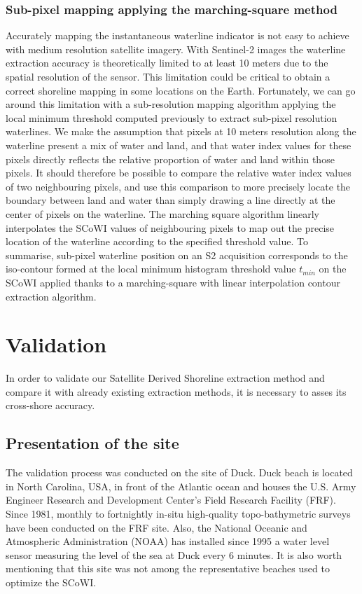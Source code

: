 \documentclass[remotesensing,article,submit,pdftex,moreauthors]{Definitions/mdpi}
\begin{document}
\subsubsection{Sub-pixel mapping applying the marching-square method}
Accurately mapping the instantaneous waterline indicator is not easy to achieve with medium resolution satellite imagery.
With Sentinel-2 images the waterline extraction accuracy is theoretically limited to at least 10 meters due to the spatial resolution of the sensor.
This limitation could be critical to obtain a correct shoreline mapping in some locations on the Earth.
Fortunately, we can go around this limitation with a sub-resolution mapping algorithm applying the local minimum threshold computed previously to extract sub-pixel resolution waterlines.
We make the assumption that pixels at 10 meters resolution along the waterline present a mix of water and land, and that water index values for these pixels directly reflects the relative proportion of water and land within those pixels. 
It should therefore be possible to compare the relative water index values of two neighbouring pixels, and use this comparison to more precisely locate the boundary between land and water than simply drawing a line directly at the center of pixels on the waterline.
The marching square algorithm linearly interpolates the SCoWI values of neighbouring pixels to map out the precise location of the waterline according to the specified threshold value.\citep{CIPOLLETTI201287}
To summarise, sub-pixel waterline position on an S2 acquisition corresponds to the iso-contour formed at the local minimum histogram threshold value $t_{min}$ on the SCoWI applied thanks to a marching-square with linear interpolation contour extraction algorithm.



\section{Validation}
In order to validate our Satellite Derived Shoreline extraction method and compare it with already existing extraction methods, it is necessary to asses its cross-shore accuracy. 

\subsection{Presentation of the site}
The validation process was conducted on the site of Duck.
Duck beach is located in North Carolina, USA, in front of the Atlantic ocean and houses the U.S. Army Engineer Research and Development Center’s Field Research Facility (FRF).
Since 1981, monthly to fortnightly in-situ high-quality topo-bathymetric surveys have been conducted on the FRF site. \citep{FORTE2017}
Also, the National Oceanic and Atmospheric Administration (NOAA) has installed since 1995 a water level sensor measuring the level of the sea at Duck every 6 minutes. \citep{park2014water}
It is also worth mentioning that this site was not among the representative beaches used to optimize the SCoWI. %
\par
\end{document}

